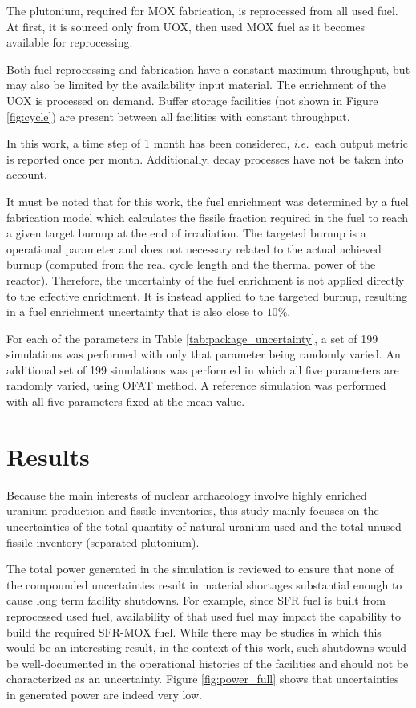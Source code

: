 \documentclass{anstrans}
\newcommand{\ie}{\emph{i.e.\ }}
\begin{document}
The plutonium, required for \gls{MOX} fabrication, is reprocessed from all used
fuel.  At first, it is sourced only from \gls{UOX}, then used \gls{MOX} fuel as
it becomes available for reprocessing.

Both fuel reprocessing and fabrication have a constant maximum throughput, but
may also be limited by the availability input material.  The enrichment of the
\gls{UOX} is processed on demand.  Buffer storage facilities (not shown in
Figure \ref{fig:cycle}) are present between all facilities with constant
throughput.

In this work, a time step of 1 month has been considered, \ie each output metric
is reported once per month. Additionally, decay processes have not be taken into
account.  

It must be noted that for this work, the fuel enrichment was determined by a
fuel fabrication model\cite{Leniau2015125} which calculates the fissile fraction
required in the fuel to reach a given target burnup at the end of irradiation.
The targeted burnup is a operational parameter and does not necessary related to the
actual achieved burnup (computed from the real cycle length and the thermal
power of the reactor). Therefore, the uncertainty of the fuel enrichment is not
applied directly to the effective enrichment. It is instead applied to the
targeted burnup, resulting in a fuel enrichment uncertainty that is also close
to $10\%$.

For each of the parameters in Table \ref{tab:package_uncertainty}, a set of 199
simulations was performed with only that parameter being randomly varied.  An
additional set of 199 simulations was performed in which all five parameters are
randomly varied, using \gls{OFAT} method.  A reference simulation was performed
with all five parameters fixed at the mean value.

\section{Results}

Because the main interests of nuclear archaeology involve highly enriched
uranium production and fissile inventories, this study mainly focuses on the
uncertainties of the total quantity of natural uranium used and the total unused
fissile inventory (separated plutonium).

The total power generated in the simulation is reviewed to ensure that none of
the compounded uncertainties result in material shortages substantial enough to
cause long term facility shutdowns.  For example, since \gls{SFR} fuel is built
from reprocessed used fuel, availability of that used fuel may impact the
capability to build the required \gls{SFR}-\gls{MOX} fuel.  While there may be
studies in which this would be an interesting result, in the context of this
work, such shutdowns would be well-documented in the operational histories of
the facilities and should not be characterized as an uncertainty.  Figure
\ref{fig:power_full} shows that uncertainties in generated power are indeed very
low.
\end{document}
